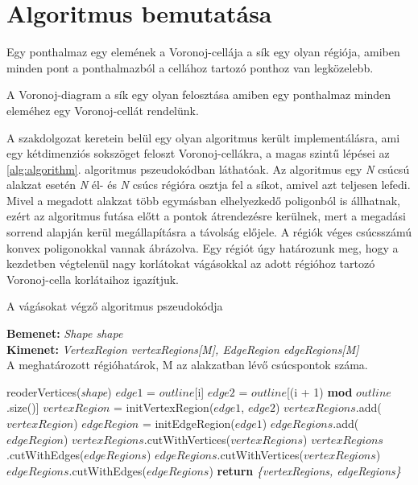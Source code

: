\section{Algoritmus bemutatása}

\begin{definition}
    Egy ponthalmaz egy elemének a Voronoj-cellája a sík egy olyan régiója, amiben minden pont a ponthalmazból a cellához tartozó ponthoz van legközelebb.
\end{definition}

\begin{definition}
    A Voronoj-diagram a sík egy olyan felosztása amiben egy ponthalmaz minden eleméhez egy Voronoj-cellát rendelünk.
\end{definition}

A szakdolgozat keretein belül egy olyan algoritmus került implementálásra, ami egy kétdimenziós sokszöget feloszt Voronoj-cellákra, a magas szintű lépései az \ref{alg:algorithm}. algoritmus pszeudokódban láthatóak. Az algoritmus egy \textit{N} csúcsú alakzat esetén \textit{N} él- és \textit{N} csúcs régióra osztja fel a síkot, amivel azt teljesen lefedi. Mivel a megadott alakzat több egymásban elhelyezkedő poligonból is állhatnak, ezért az algoritmus futása előtt a pontok átrendezésre kerülnek, mert a megadási sorrend alapján kerül megállapításra a távolság előjele. A régiók véges csúcsszámú konvex poligonokkal vannak ábrázolva. Egy régiót úgy határozunk meg, hogy a kezdetben végtelenül nagy korlátokat vágásokkal az adott régióhoz tartozó Voronoj-cella korlátaihoz igazítjuk.

\begin{algorithm}[H]
    \caption{A vágásokat végző algoritmus pszeudokódja}
    \label{alg:algorithm}
    \textbf{Bemenet:} \textit{Shape shape} \\
    \textbf{Kimenet:} \textit{VertexRegion vertexRegions[M], EdgeRegion edgeRegions[M]}\\A meghatározott régióhatárok, M az alakzatban lévő csúcspontok száma.
    \begin{algorithmic}[1]
        \State reoderVertices(\textit{shape})
                \State $edge1$ = $outline$[i]
                \State $edge2$ = $outline$[(i + 1) \textbf{mod} $outline$.size()]
                \State $vertexRegion$ = initVertexRegion($edge1$, $edge2$)
                \State $vertexRegions$.add($vertexRegion$)
                \State $edgeRegion$ = initEdgeRegion($edge1$)
                \State $edgeRegions$.add($edgeRegion$)
            \EndFor
        \EndFor
        \State $vertexRegions$.cutWithVertices($vertexRegions$)
        \State $vertexRegions$.cutWithEdges($edgeRegions$)
        \State $edgeRegions$.cutWithVertices($vertexRegions$)
        \State $edgeRegions$.cutWithEdges($edgeRegions$)
        \State \textbf{return} \textit{\{vertexRegions, edgeRegions\}}
    \end{algorithmic}
\end{algorithm}

